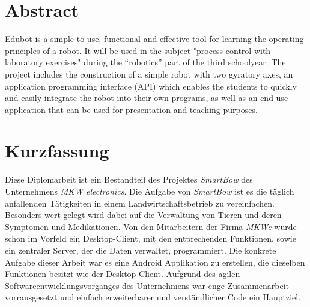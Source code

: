 
{}

\section*{Abstract}
Edubot is a simple-to-use, functional and effective tool for learning the operating principles of a robot. It will be used in the subject "process control with laboratory exercises" during the “robotics” part of the third schoolyear. The project includes the construction of a simple robot with two gyratory axes, an application programming interface (API) which enables the students to quickly and easily integrate the robot into their own programs, as well as an end-use application that can be used for presentation and teaching purposes. 

\section*{Kurzfassung}
Diese Diplomarbeit ist ein Bestandteil des Projektes \textit{SmartBow} des Unternehmens \textit{MKW electronics}. Die Aufgabe von \textit{SmartBow} ist es die täglich anfallenden Tätigkeiten in einem Landwirtschaftsbetrieb zu vereinfachen. Besonders wert gelegt wird dabei auf die Verwaltung von Tieren und deren Symptomen und Medikationen. Von den Mitarbeitern der Firma \textit{MKWe} wurde schon im Vorfeld ein Desktop-Client, mit den entprechenden Funktionen, sowie ein zentraler Server, der die Daten verwaltet, programmiert. Die konkrete Aufgabe dieser Arbeit war es eine Android Applikation zu erstellen, die dieselben Funktionen besitzt wie der Desktop-Client. Aufgrund des agilen Softwareentwicklungsvorganges des Unternehmens war enge Zusammenarbeit vorrausgesetzt und einfach erweiterbarer und verständlicher Code ein Hauptziel.


%
%